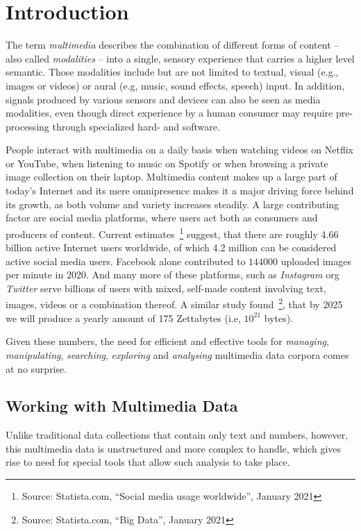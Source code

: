 \chapter{Introduction}
The term \emph{multimedia} describes the combination of different forms of content -- also called \emph{modalities} -- into a single, sensory experience that carries a higher level semantic. Those modalities include but are not limited to textual, visual (e.g., images or videos) or aural (e.g, music, sound effects, speech) input. In addition, signals produced by various sensors and devices can also be seen as media modalities, even though direct experience by a human consumer may require pre-processing through specialized hard- and software.

People interact with multimedia on a daily basis when watching videos on Netflix or YouTube, when listening to music on Spotify or when browsing a private image collection on their laptop. Multimedia content makes up a large part of today's Internet and its mere omnipresence makes it a major driving force behind its growth, as both volume and variety increases steadily. A large contributing factor are social media platforms, where users act both as consumers and producers of content. Current estimates~\footnote{Source: Statista.com, ``Social media usage worldwide'', January 2021} suggest, that there are roughly 4.66 billion active Internet users worldwide, of which 4.2 million can be considered active social media users. Facebook alone contributed to $144000$ uploaded images per minute in 2020. And many more of these  platforms, such as \emph{Instagram} org \emph{Twitter} serve billions of users with mixed, self-made content involving text, images, videos or a combination thereof. A similar study found~\footnote{Source: Statista.com, ``Big Data'', January 2021}, that by 2025 we will produce a yearly amount of 175 Zettabytes (i.e, $10^{21}$ bytes).

Given these numbers, the need for efficient and effective tools for \emph{managing}, \emph{manipulating}, \emph{searching}, \emph{exploring} and \emph{analysing} multimedia data corpora comes at no surprise.

\section{Working with Multimedia Data}

Unlike traditional data collections that contain only text and numbers, however, this multimedia data is unstructured and more complex to handle, which gives rise to need for special tools that allow such analysis to take place.


